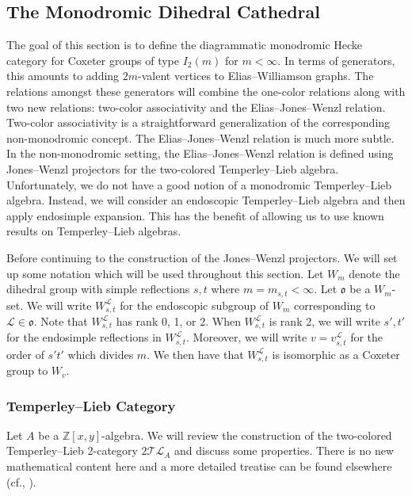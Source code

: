 \documentclass{amsart}
\newcommand{\Z}{\mathbb{Z}}
\newcommand{\scrL}{\mathcal{L}}
\newcommand{\fr}[1]{\mathfrak{#1}}
\newcommand{\TLcat}{2\mathcal{T}\mathcal{L}}
\theoremstyle{definition}
\numberwithin{equation}{subsection}
\begin{document}
\subsection{The Monodromic Dihedral Cathedral} 

The goal of this section is to define the diagrammatic monodromic Hecke category for Coxeter groups of type $I_2 (m)$ for $m < \infty$.
In terms of generators, this amounts to adding $2m$-valent vertices to Elias--Williamson graphs.
The relations amongst these generators will combine the one-color relations along with two new relations: two-color associativity and the Elias--Jones--Wenzl relation.
Two-color associativity is a straightforward generalization of the corresponding non-monodromic concept.
The Elias--Jones--Wenzl relation is much more subtle. 
In the non-monodromic setting, the Elias--Jones--Wenzl relation is defined using Jones--Wenzl projectors for the two-colored Temperley--Lieb algebra.
Unfortunately, we do not have a good notion of a monodromic Temperley--Lieb algebra. 
Instead, we will consider an endoscopic Temperley--Lieb algebra and then apply endosimple expansion. 
This has the benefit of allowing us to use known results on Temperley--Lieb algebras.

Before continuing to the construction of the Jones--Wenzl projectors. We will set up some notation which will be used throughout this section.
Let $W_m$ denote the dihedral group with simple reflections $s,t$ where $m = m_{s,t} < \infty$.
Let $\fr{o}$ be a $W_m$-set. We will write $W_{s,t}^{\scrL}$ for the endoscopic subgroup of $W_m$ corresponding to $\scrL \in \fr{o}$.
Note that $W_{s,t}^{\scrL}$ has rank 0, 1, or 2. 
When $W_{s,t}^{\scrL}$ is rank 2, we will write $s', t'$ for the endosimple reflections in $W_{s,t}^{\scrL}$.
Moreover, we will write $v = v_{s,t}^{\scrL}$ for the order of $s't'$ which divides $m$. We then have that $W_{s,t}^{\scrL}$ is isomorphic as a Coxeter group to $W_v$.

\subsubsection{Temperley--Lieb Category}

Let $A$ be a $\Z[x,y]$-algebra.
We will review the construction of the two-colored Temperley--Lieb 2-category $\TLcat_A$ and discuss some properties.
There is no new mathematical content here and a more detailed treatise can be found elsewhere (cf., \cite{EW, EW17, Hazi}).
\end{document}
